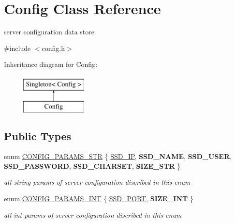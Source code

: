\hypertarget{classConfig}{\section{\-Config \-Class \-Reference}
\label{classConfig}
}


server configuration data store  




{\ttfamily \#include $<$config.\-h$>$}

\-Inheritance diagram for \-Config\-:\begin{figure}[H]
\begin{center}
\leavevmode
\includegraphics[height=2.000000cm]{classConfig}
\end{center}
\end{figure}
\subsection*{\-Public \-Types}
\begin{DoxyCompactItemize}
\item 
enum \hyperlink{classConfig_a6d78e4d65fd44d149ad6facce11bc11e}{\-C\-O\-N\-F\-I\-G\-\_\-\-P\-A\-R\-A\-M\-S\-\_\-\-S\-T\-R} \{ \*
\hyperlink{classConfig_a6d78e4d65fd44d149ad6facce11bc11eadb86d6ef5692400d4a3c0a2fe54dba3d}{\-S\-S\-D\-\_\-\-I\-P}, 
{\bfseries \-S\-S\-D\-\_\-\-N\-A\-M\-E}, 
{\bfseries \-S\-S\-D\-\_\-\-U\-S\-E\-R}, 
{\bfseries \-S\-S\-D\-\_\-\-P\-A\-S\-S\-W\-O\-R\-D}, 
\*
{\bfseries \-S\-S\-D\-\_\-\-C\-H\-A\-R\-S\-E\-T}, 
{\bfseries \-S\-I\-Z\-E\-\_\-\-S\-T\-R}
 \}
\begin{DoxyCompactList}\small\item\em all string params of server configuration discribed in this enum \end{DoxyCompactList}\item 
enum \hyperlink{classConfig_a0f80a094ada73f8574e85b160a5e47b7}{\-C\-O\-N\-F\-I\-G\-\_\-\-P\-A\-R\-A\-M\-S\-\_\-\-I\-N\-T} \{ \hyperlink{classConfig_a0f80a094ada73f8574e85b160a5e47b7adcfee10d7cec219fc657459ee83d642f}{\-S\-S\-D\-\_\-\-P\-O\-R\-T}, 
{\bfseries \-S\-I\-Z\-E\-\_\-\-I\-N\-T}
 \}
\begin{DoxyCompactList}\small\item\em all int params of server configuration discribed in this enum \end{DoxyCompactList}\end{DoxyCompactItemize}
